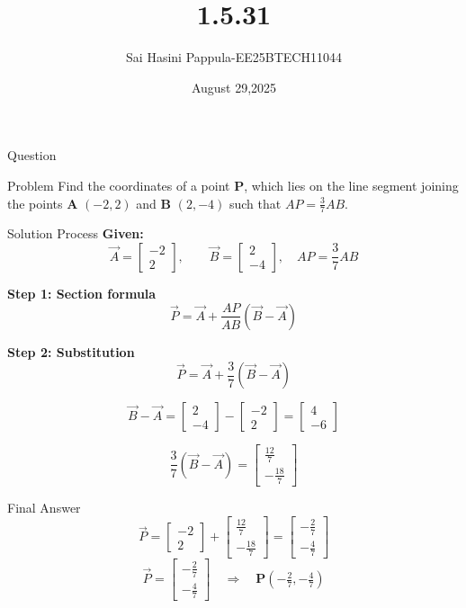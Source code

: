 \documentclass{beamer}
\title %
{1.5.31}
\date{August 29,2025}
\author %
{Sai Hasini Pappula-EE25BTECH11044}
\begin{document}
\frame{\titlepage}
\begin{frame}{Question}
\begin{block}{Problem}
Find the coordinates of a point \textbf{P}, which lies on the line segment joining the points 
\textbf{A} $(-2,2)$ and \textbf{B} $(2,-4)$ such that $AP = \frac{3}{7} AB$.
\end{block}
\end{frame}

\begin{frame}{Solution Process}
\textbf{Given:}
\[
\vec{A} = \begin{bmatrix}-2 \\ 2\end{bmatrix},\qquad 
\vec{B} = \begin{bmatrix}2 \\ -4\end{bmatrix},\quad
AP = \frac{3}{7}AB
\]

\textbf{Step 1: Section formula}
\[
\vec{P} = \vec{A} + \frac{AP}{AB}(\vec{B}-\vec{A})
\]

\textbf{Step 2: Substitution}
\[
\vec{P} = \vec{A} + \frac{3}{7}(\vec{B}-\vec{A})
\]

\[
\vec{B}-\vec{A} =
\begin{bmatrix}2 \\ -4\end{bmatrix} -
\begin{bmatrix}-2 \\ 2\end{bmatrix} =
\begin{bmatrix}4 \\ -6\end{bmatrix}
\]

\[
\frac{3}{7}(\vec{B}-\vec{A}) =
\begin{bmatrix}\tfrac{12}{7} \\ -\tfrac{18}{7}\end{bmatrix}
\]


\end{frame}

\begin{frame}{Final Answer}
\[
\vec{P} = \begin{bmatrix}-2 \\ 2\end{bmatrix} + 
\begin{bmatrix}\tfrac{12}{7} \\ -\tfrac{18}{7}\end{bmatrix} =
\begin{bmatrix}-\tfrac{2}{7} \\ -\tfrac{4}{7}\end{bmatrix}
\]
\[
\vec{P} = \begin{bmatrix}-\tfrac{2}{7} \\ -\tfrac{4}{7}\end{bmatrix} 
\quad \Rightarrow \quad 
\textbf{P}\left(-\tfrac{2}{7}, -\tfrac{4}{7}\right)
\]
\end{frame}
\end{document}
